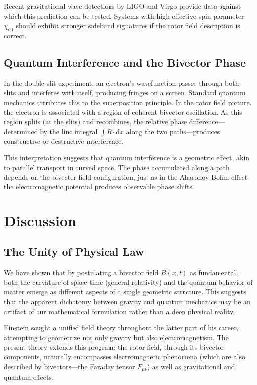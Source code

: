 \documentclass[11pt,a4paper]{article}
\numberwithin{equation}{section}
\theoremstyle{plain}
\theoremstyle{definition}
\theoremstyle{remark}
\newcommand{\dd}{\mathrm{d}}
\begin{document}
Recent gravitational wave detections by LIGO and Virgo provide data against which this prediction can be tested. Systems with high effective spin parameter $\chi_{\mathrm{eff}}$ should exhibit stronger sideband signatures if the rotor field description is correct.

\subsection{Quantum Interference and the Bivector Phase}

In the double-slit experiment, an electron's wavefunction passes through both slits and interferes with itself, producing fringes on a screen. Standard quantum mechanics attributes this to the superposition principle. In the rotor field picture, the electron is associated with a region of coherent bivector oscillation. As this region splits (at the slits) and recombines, the relative phase difference---determined by the line integral $\int B \cdot \dd x$ along the two paths---produces constructive or destructive interference.

This interpretation suggests that quantum interference is a geometric effect, akin to parallel transport in curved space. The phase accumulated along a path depends on the bivector field configuration, just as in the Aharonov-Bohm effect the electromagnetic potential produces observable phase shifts.

\section{Discussion}
\label{sec:discussion}

\subsection{The Unity of Physical Law}

We have shown that by postulating a bivector field $B(x,t)$ as fundamental, both the curvature of space-time (general relativity) and the quantum behavior of matter emerge as different aspects of a single geometric structure. This suggests that the apparent dichotomy between gravity and quantum mechanics may be an artifact of our mathematical formulation rather than a deep physical reality.

Einstein sought a unified field theory throughout the latter part of his career, attempting to geometrize not only gravity but also electromagnetism. The present theory extends this program: the rotor field, through its bivector components, naturally encompasses electromagnetic phenomena (which are also described by bivectors---the Faraday tensor $F_{\mu\nu}$) as well as gravitational and quantum effects.
\end{document}
